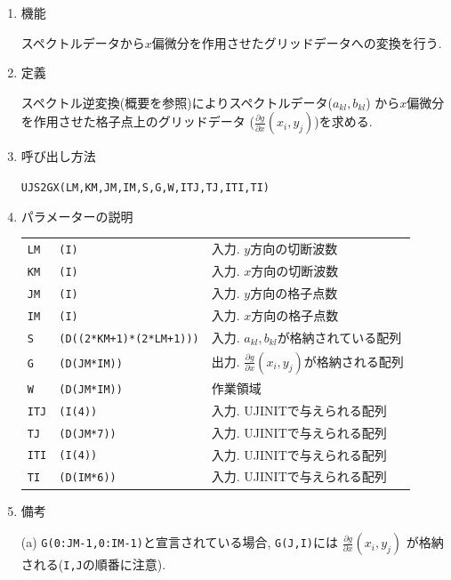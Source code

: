 \documentclass[a4j,fleqn]{jarticle}
\begin{document}
\begin{enumerate}

\item 機能 

スペクトルデータから$x$偏微分を作用させたグリッドデータへの変換を行う.

\item 定義

スペクトル逆変換(概要を参照)によりスペクトルデータ($a_{kl},b_{kl}$)
から$x$偏微分を作用させた格子点上のグリッドデータ
($\frac{\partial g}{\partial x}(x_i,y_j)$)を求める.

\item 呼び出し方法 

{\tt UJS2GX(LM,KM,JM,IM,S,G,W,ITJ,TJ,ITI,TI)}
  
\item パラメーターの説明

\begin{tabular}{lll}
{\tt LM} & {\tt (I)} & 入力. $y$方向の切断波数\\
{\tt KM} & {\tt (I)} & 入力. $x$方向の切断波数\\
{\tt JM} & {\tt (I)} & 入力. $y$方向の格子点数\\
{\tt IM} & {\tt (I)} & 入力. $x$方向の格子点数\\
{\tt S} & {\tt (D((2*KM+1)*(2*LM+1)))} & 入力. $a_{kl},b_{kl}$が格納されている配列\\
{\tt G} & {\tt (D(JM*IM))} & 出力. $\frac{\partial g}{\partial x}(x_i,y_j)$が格納される配列\\
{\tt W} & {\tt (D(JM*IM))} & 作業領域\\
{\tt ITJ} & {\tt (I(4))} & 入力. UJINITで与えられる配列\\
{\tt TJ} & {\tt (D(JM*7))} & 入力. UJINITで与えられる配列\\
{\tt ITI} & {\tt (I(4))} & 入力. UJINITで与えられる配列\\
{\tt TI} & {\tt (D(IM*6))} & 入力. UJINITで与えられる配列
\end{tabular}

\item 備考

(a) {\tt G(0:JM-1,0:IM-1)}と宣言されている場合, {\tt G(J,I)}には
    $\frac{\partial g}{\partial x}(x_i,y_j)$
    が格納される({\tt I,J}の順番に注意).

\end{enumerate}

\end{document}
